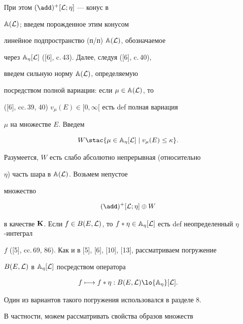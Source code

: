 При этом ${(\add)^+}[{\cal L};\eta]$ --- конус в


${{\Bbb A}({\cal L})}$; введем порожденное этим конусом


линейное подпространство (п/п) ${{\Bbb A}({\cal L})}$, обозначаемое


через ${{\Bbb A}_\eta}[{\cal L}]$ ([6], c.\,43). Далее, следуя ([6], c.\,40),


введем сильную норму ${{\Bbb A}({\cal L})}$, определяемую


посредством полной вариации: если $\mu \in {{\Bbb A}({\cal L})}$, то


([6], cc.\,39, 40) ${{v_\mu}(E)} \in [0,\infty[$ есть def полная вариация


$\mu$ на множестве $E$. Введем


\begin{equation}


W \stac \{\mu \in {{\Bbb A}_\eta}[{\cal L}] \mid {v_\mu}(E) \le \kappa\}.


\end{equation}


Разумеется, $W$ есть слабо абсолютно непрерывная (относительно


$\eta$) часть шара в ${{\Bbb A}({\cal L})}$. Возьмем непустое


множество


\begin{equation}


{(\add)^+}[{\cal L};\eta] \oplus W


\end{equation}


в качестве ${\bold K}$. Если $f \in B(E,{\cal L})$, то $f*\eta \in


{{\Bbb A}_\eta}[{\cal L}]$ есть def неопределенный $\eta$-интеграл


$f$ ([5], cc.\,69, 86). Как и в [5], [6], [10], [13], рассматриваем погружение


$B(E,{\cal L})$ в ${{\Bbb A}_\eta}[{\cal L}]$ посредством оператора


\begin{equation}


f \longmapsto {f*\eta}:B(E,{\cal L}) \lo {{\Bbb A}_\eta}[{\cal L}].


\end{equation}


Один из вариантов такого погружения использовался в разделе 8.


В частности, можем рассматривать свойства образов множеств


